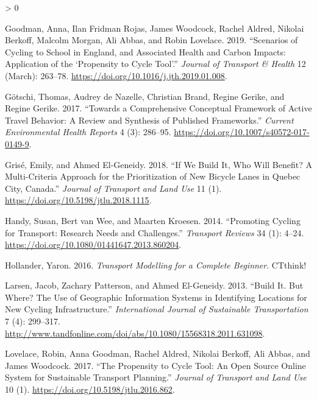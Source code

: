 \documentclass[galley]{jtlu-article-2col}
\newlength{\cslhangindent}
\newenvironment{CSLReferences}[2] %
 {%
  \setlength{\parindent}{0pt}
  \ifodd #1 \everypar{\setlength{\hangindent}{\cslhangindent}}\ignorespaces\fi
  \ifnum #2 > 0
  \setlength{\parskip}{#2\baselineskip}
  \fi
 }%
 {}
\begin{document}
\begin{CSLReferences}{1}{0}
\leavevmode\hypertarget{ref-goodman_scenarios_2019}{}%
Goodman, Anna, Ilan Fridman Rojas, James Woodcock, Rachel Aldred, Nikolai Berkoff, Malcolm Morgan, Ali Abbas, and Robin Lovelace. 2019. {``Scenarios of Cycling to School in {England}, and Associated Health and Carbon Impacts: {Application} of the {`{Propensity} to {Cycle Tool}'}.''} \emph{Journal of Transport \& Health} 12 (March): 263--78. \url{https://doi.org/10.1016/j.jth.2019.01.008}.

\leavevmode\hypertarget{ref-gotschi_comprehensive_2017}{}%
Götschi, Thomas, Audrey de Nazelle, Christian Brand, Regine Gerike, and Regine Gerike. 2017. {``Towards a {Comprehensive Conceptual Framework} of {Active Travel Behavior}: A {Review} and {Synthesis} of {Published Frameworks}.''} \emph{Current Environmental Health Reports} 4 (3): 286--95. \url{https://doi.org/10.1007/s40572-017-0149-9}.

\leavevmode\hypertarget{ref-grise_if_2018}{}%
Grisé, Emily, and Ahmed El-Geneidy. 2018. {``If We Build It, Who Will Benefit? {A} Multi-Criteria Approach for the Prioritization of New Bicycle Lanes in {Quebec City}, {Canada}.''} \emph{Journal of Transport and Land Use} 11 (1). \url{https://doi.org/10.5198/jtlu.2018.1115}.

\leavevmode\hypertarget{ref-handy_promoting_2014}{}%
Handy, Susan, Bert van Wee, and Maarten Kroesen. 2014. {``Promoting {Cycling} for {Transport}: {Research Needs} and {Challenges}.''} \emph{Transport Reviews} 34 (1): 4--24. \url{https://doi.org/10.1080/01441647.2013.860204}.

\leavevmode\hypertarget{ref-hollander_transport_2016}{}%
Hollander, Yaron. 2016. \emph{Transport {Modelling} for a {Complete Beginner}}. {CTthink!}

\leavevmode\hypertarget{ref-larsen_build_2013}{}%
Larsen, Jacob, Zachary Patterson, and Ahmed El-Geneidy. 2013. {``Build It. {But} Where? {The} Use of Geographic Information Systems in Identifying Locations for New Cycling Infrastructure.''} \emph{International Journal of Sustainable Transportation} 7 (4): 299--317. \url{http://www.tandfonline.com/doi/abs/10.1080/15568318.2011.631098}.

\leavevmode\hypertarget{ref-lovelace_propensity_2017}{}%
Lovelace, Robin, Anna Goodman, Rachel Aldred, Nikolai Berkoff, Ali Abbas, and James Woodcock. 2017. {``The {Propensity} to {Cycle Tool}: {An} Open Source Online System for Sustainable Transport Planning.''} \emph{Journal of Transport and Land Use} 10 (1). \url{https://doi.org/10.5198/jtlu.2016.862}.


\end{CSLReferences}
\end{document}
